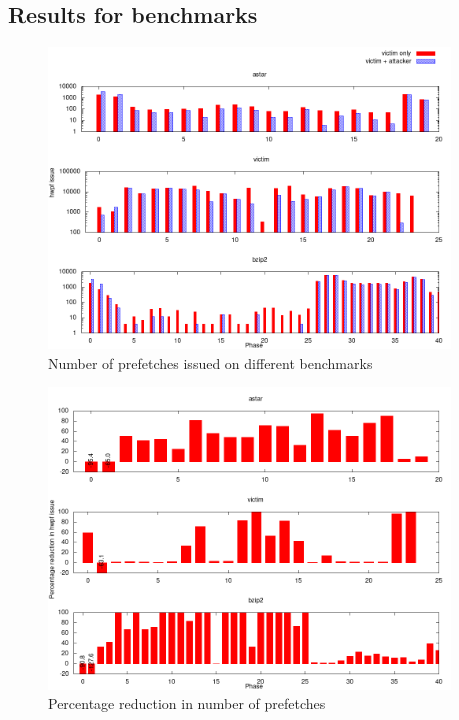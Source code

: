 \subsection{Results for benchmarks}

\begin{figure}[h]
    \centering
    \includegraphics[width=0.95\textwidth]{figures/hwpf_num}
    \caption{Number of prefetches issued on different benchmarks}
    \label{fig:prefetch_attack}
\end{figure}

\begin{figure}[h]
    \centering
    \includegraphics[width=0.95\textwidth]{figures/hwpf_perc}
    \caption{Percentage reduction in number of prefetches}
    \label{fig:prefetch_percred}
\end{figure}

